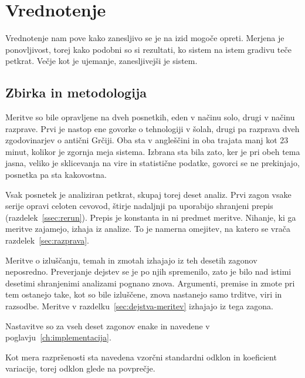 \documentclass[a4paper, 12pt]{book}
\begin{document}

\chapter{Vrednotenje}
\label{ch:vrednotenje}

Vrednotenje nam pove kako zanesljivo se je na izid mogoče opreti. Merjena je ponovljivost, torej kako podobni so si rezultati, ko sistem na istem gradivu teče petkrat. Večje kot je ujemanje, zanesljivejši je sistem.

\section{Zbirka in metodologija}
\label{sec:zbirka}

Meritve so bile opravljene na dveh posnetkih, eden v načinu solo, drugi v načinu razprave. Prvi je nastop ene govorke o tehnologiji v šolah, drugi pa razprava
dveh zgodovinarjev o antični Grčiji. Oba sta v angleščini in oba trajata manj kot 23 minut, kolikor je zgornja meja sistema.
Izbrana sta bila zato, ker je pri obeh tema jasna, veliko je
sklicevanja na vire in statistične podatke, govorci se ne prekinjajo, posnetka pa sta kakovostna.

Vsak posnetek je analiziran petkrat, skupaj torej deset analiz. Prvi zagon vsake
serije opravi celoten cevovod, štirje nadaljnji pa uporabijo shranjeni prepis
(razdelek~\ref{ssec:rerun}). Prepis je konstanta in ni predmet meritve. Nihanje,
ki ga meritve zajamejo, izhaja iz analize. To je namerna omejitev, na katero se
vrača razdelek~\ref{sec:razprava}.

Meritve o izluščanju, temah in zmotah izhajajo iz teh desetih zagonov
neposredno. Preverjanje dejstev se je po njih spremenilo, zato je bilo nad istimi
desetimi shranjenimi analizami pognano znova. Argumenti, premise in zmote pri tem
ostanejo take, kot so bile izluščene, znova nastanejo samo trditve, viri in
razsodbe. Meritve v razdelku~\ref{sec:dejstva-meritev} izhajajo iz tega zagona.

Nastavitve so za vseh deset zagonov enake in navedene v
poglavju~\ref{ch:implementacija}.

Kot mera razpršenosti sta navedena vzorčni standardni odklon in koeficient
variacije, torej odklon glede na povprečje.
\end{document}
